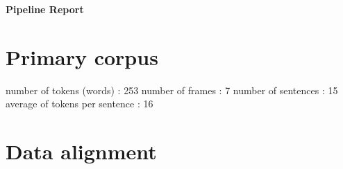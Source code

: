 \documentclass{article}%
\begin{document}
%
\normalsize%
\begin{minipage}{\textwidth}%
\centering%
\begin{Large}%
\textbf{Pipeline Report}%
\end{Large}%
\end{minipage}%
\section{Primary corpus}%
\label{sec:Primary corpus}%
number of tokens (words) : 253%
\newline%
number of frames : 7%
\newline%
number of sentences : 15%
\newline%
average of tokens per sentence : 16

%
\section{Data alignment}%
\label{sec:Data alignment}%
\end{document}

